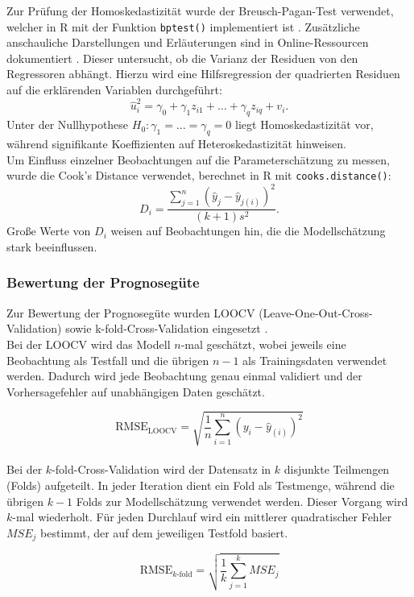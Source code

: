 Zur Prüfung der Homoskedastizität wurde der Breusch-Pagan-Test verwendet, welcher in R mit der Funktion \texttt{bptest()} implementiert ist \cite{breusch}. 
Zusätzliche anschauliche Darstellungen und Erläuterungen sind in Online-Ressourcen dokumentiert \cite{bp_extra1, bp_extra2}.
Dieser untersucht, ob die Varianz der Residuen von den Regressoren abhängt. Hierzu wird eine Hilfsregression der quadrierten Residuen auf die erklärenden Variablen durchgeführt:
\[\hat{u}_i^2 = \gamma_0 + \gamma_1 z_{i1} + \dots + \gamma_q z_{iq} + v_i.\]
Unter der Nullhypothese \(H_0: \gamma_1 = \dots = \gamma_q = 0\) liegt Homoskedastizität vor, während signifikante Koeffizienten auf Heteroskedastizität hinweisen.\\

Um Einfluss einzelner Beobachtungen auf die Parameterschätzung zu messen, wurde die Cook's Distance verwendet, berechnet in R mit \texttt{cooks.distance()}:
$$D_i = \frac{\sum_{j=1}^n (\hat{y}_j - \hat{y}_{j(i)})^2}{(k + 1) s^2}.$$
Große Werte von \(D_i\) weisen auf Beobachtungen hin, die die Modellschätzung stark beeinflussen.\\

\subsubsection{Bewertung der Prognosegüte}
Zur Bewertung der Prognosegüte wurden LOOCV (Leave-One-Out-Cross-Validation) sowie k-fold-Cross-Validation eingesetzt \cite{kfold}.\\

Bei der LOOCV wird das Modell \(n\)-mal geschätzt, wobei jeweils eine Beobachtung als Testfall und die übrigen \(n-1\) als Trainingsdaten verwendet werden. Dadurch wird jede Beobachtung genau einmal validiert und der Vorhersagefehler auf unabhängigen Daten geschätzt.

\[\mathrm{RMSE}_{\mathrm{LOOCV}} = \sqrt{\frac{1}{n} \sum_{i=1}^n (y_i - \hat{y}_{(i)})^2}\] \\

Bei der \( k \)-fold-Cross-Validation wird der Datensatz in \( k \) disjunkte Teilmengen (Folds) aufgeteilt. In jeder Iteration dient ein Fold als Testmenge, während die übrigen \( k-1 \) Folds zur Modellschätzung verwendet werden. Dieser Vorgang wird \( k \)-mal wiederholt. Für jeden Durchlauf wird ein mittlerer quadratischer Fehler \(MSE_j\) bestimmt, der auf dem jeweiligen Testfold basiert.

\[\mathrm{RMSE}_{k\text{-fold}} = \sqrt{\frac{1}{k} \sum_{j=1}^{k} MSE_j}\]\\

